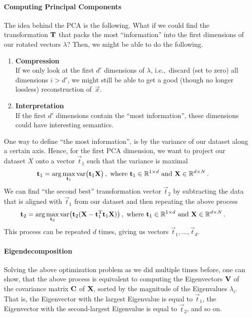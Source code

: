 \documentclass[10pt,letterpaper,oneside]{article}
\begin{document}
\paragraph{Computing Principal Components}
The idea behind the PCA is the following. What if we could find the transformation ${\mathbf{T}}$ that packs the most \enquote{information} into the first dimensions of our rotated vectors $\lambda$? Then, we might be able to do the following.
\begin{enumerate}
	\item \textbf{Compression}\\
	If we only look at the first $d'$ dimensions of $\lambda$, i.e.,~discard (set to zero) all dimensions $i > d'$, we might still be able to get a good (though no longer lossless) reconstruction of~$\vec x$.
	\item \textbf{Interpretation}\\
	If the first $d'$ dimensions contain the \enquote{most information}, these dimensions could have interesting semantics.
\end{enumerate}
One way to define \enquote{the most information}, is by the variance of our dataset along a certain axis. Hence, for the first PCA dimension, we want to project our dataset $X$ onto a vector $\vec t_1$ such that the variance is maximal
\begin{align*}
	{\mathbf{t}}_1 &= \arg\max_{{\mathbf{t}}_1} \mathrm{var}\big({\mathbf{t}}_1 {\mathbf{X}}\big) \,, \text{ where } {\mathbf{t}}_1 \in \mathbb{R}^{1 \times d} \text{ and } {\mathbf{X}} \in \mathbb{R}^{d \times N} \,.
\end{align*}
We can find \enquote{the second best} transformation vector $\vec t_2$ by subtracting the data that is aligned with $\vec t_1$ from our dataset and then repeating the above process
\begin{align*}
	{\mathbf{t}}_2 &= \arg\max_{{\mathbf{t}}_2} \mathrm{var}\big({\mathbf{t}}_2 ( {\mathbf{X}} - {\mathbf{t}}_1^{\mathrm{T}} {\mathbf{t}}_1 {\mathbf{X}}) \big) \,, \text{ where } {\mathbf{t}}_1 \in \mathbb{R}^{1 \times d} \text{ and } {\mathbf{X}} \in \mathbb{R}^{d \times N} \,.
\end{align*}
This process can be repeated $d$ times, giving us vectors $\vec t_1, \ldots, \vec t_d$.

\paragraph{Eigendecomposition}
Solving the above optimization problem as we did multiple times before, one can show, that the above process is equivalent to computing the Eigenvectors ${\mathbf{V}}$ of the covariance matrix ${\mathbf{C}}$ of ${\mathbf{X}}$, sorted by the magnitude of the Eigenvalues $\lambda_i$. That is, the Eigenvector with the largest Eigenvalue is equal to $\vec t_1$, the Eigenvector with the second-largest Eigenvalue is equal to $\vec t_2$, and so on.
\end{document}
